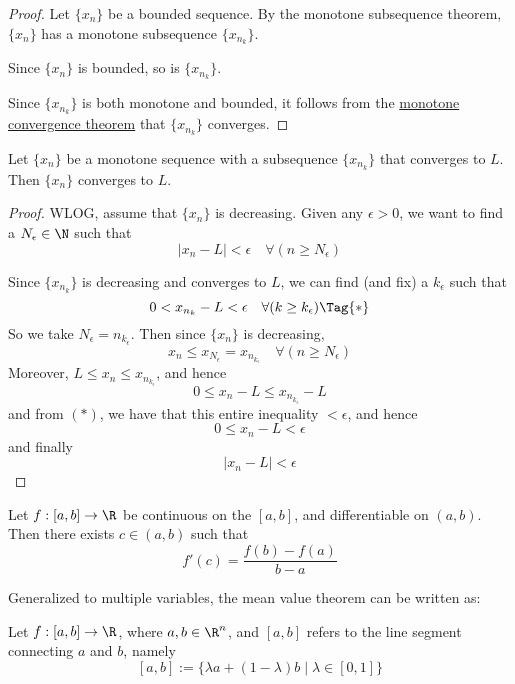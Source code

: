 \begin{proof}
  \def\xn{\{x_n\}}
  \def\xnk{\{x_{n_k}\}}

  Let $\xn$ be a bounded sequence. By the monotone subsequence theorem, $\xn$ has
  a monotone subsequence $\xnk$.

  Since $\xn$ is bounded, so is $\xnk$.

  Since $\xnk$ is both monotone and bounded, it follows from the
  \href{ca25eb7}{monotone convergence theorem} that $\xnk$ converges.
\end{proof}


\label{aaf3ba6}

Let $\{x_n\}$ be a monotone sequence with a subsequence $\{x_{n_k}\}$ that
converges to $L$. Then $\{x_n\}$ converges to $L$.

\begin{proof}
  WLOG, assume that $\{x_n\}$ is decreasing.
  Given any $\epsilon>0$, we want to find a $N_\epsilon\in\N$ such that
  $$
    |x_n-L|<\epsilon\quad\forall(n\geq N_\epsilon)
  $$

  Since $\{x_{n_k}\}$ is decreasing and converges to $L$, we can find (and fix) a
  $k_\epsilon$ such that
  \begin{equation*}
    0<x_{n_k}-L<\epsilon\quad\forall(k\geq k_\epsilon)\Tag{*}
  \end{equation*}
  So we take $N_\epsilon=n_{k_\epsilon}$. Then since $\{x_n\}$ is
  decreasing,
  $$
    x_n\leq x_{N_\epsilon}=x_{n_{k_\epsilon}}\quad\forall(n\geq N_\epsilon)
  $$
  Moreover, $L\leq x_n\leq x_{n_{k_\epsilon}}$, and hence
  $$0\leq x_n-L\leq x_{n_{k_\epsilon}}-L$$
  and from $(*)$, we have that this entire inequality $<\epsilon$, and hence
  $$0\leq x_n-L<\epsilon$$
  and finally
  $$|x_n-L|<\epsilon$$
\end{proof}

\label{d37aa2b}

Let $f:[a,b]\to\R$ be continuous on the $[a,b]$, and differentiable on $(a,b)$.
Then there exists $c\in(a,b)$ such that
$$
  f'(c)=\frac{f(b)-f(a)}{b-a}
$$

Generalized to multiple variables, the mean value theorem can be written as:

Let $f:[a,b]\to\R$, where $a,b\in\R^n$, and $[a,b]$ refers to the line segment
connecting $a$ and $b$, namely
$$
  [a,b]:=\{\lambda a+(1-\lambda)b\mid\lambda\in[0,1]\}
$$

